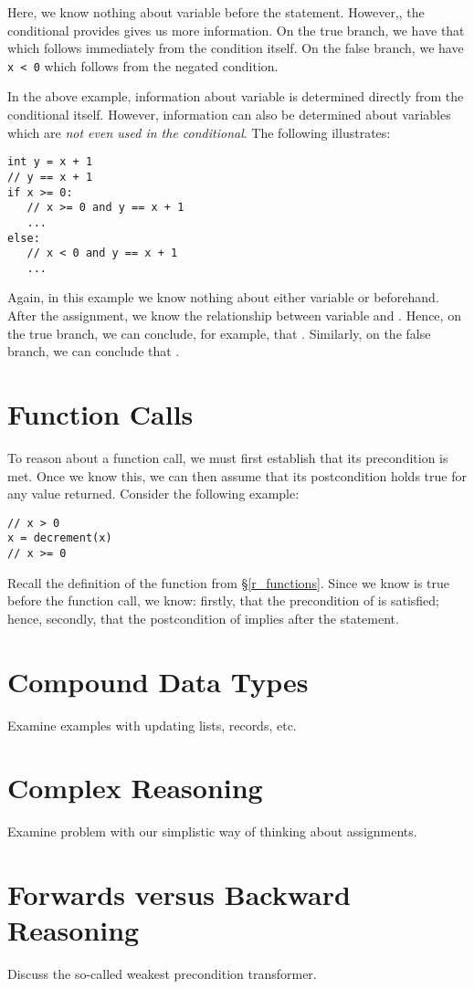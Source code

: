 Here, we know nothing about variable  before the statement.  However,, the conditional provides gives us more information.  On the true branch, we have that  which follows immediately from the condition itself.  On the false branch, we have \lstinline{x < 0} which follows from the negated condition.

In the above example, information about variable  is determined directly from the conditional itself.  However, information can also be determined about variables which are {\em not even used in the conditional}.  The following illustrates:

\begin{lstlisting}
int y = x + 1
// y == x + 1
if x >= 0:
   // x >= 0 and y == x + 1
   ...
else:
   // x < 0 and y == x + 1
   ...
\end{lstlisting}

Again, in this example we know nothing about either variable  or  beforehand.  After the assignment, we know the relationship between variable  and .  Hence, on the true branch, we can conclude, for example, that .  Similarly, on the false branch, we can conclude that .

\section{Function Calls}

To reason about a function call, we must first establish that its precondition is met.  Once we know this, we can then assume that its postcondition holds true for any value returned.  Consider the following example:

\begin{lstlisting}
// x > 0
x = decrement(x)
// x >= 0
\end{lstlisting}

Recall the definition of the  function from \S\ref{r_functions}.  Since we know  is true before the function call, we know: firstly, that the precondition of  is satisfied; hence, secondly, that the postcondition of  implies  after the statement.

\section{Compound Data Types}
Examine examples with updating lists, records, etc.

\section{Complex Reasoning}
Examine problem with our simplistic way of thinking about assignments.

\section{Forwards versus Backward Reasoning}
Discuss the so-called weakest precondition transformer.


